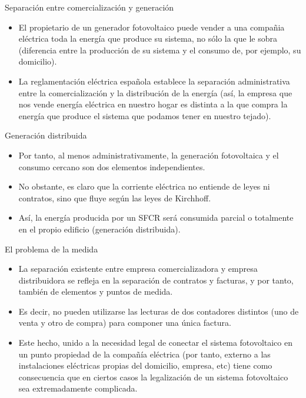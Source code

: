 \documentclass[xcolor={usenames,svgnames,dvipsnames}]{beamer}
\begin{document}
\begin{frame}[label=sec-1-4-2]{Separación entre comercialización y generación}
\begin{itemize}
\item El propietario de un generador fotovoltaico puede vender a una compañia eléctrica toda la energía que produce su sistema, no sólo la que le sobra (diferencia entre la producción de su sistema y el consumo de, por ejemplo, su domicilio).

\item La reglamentación eléctrica española establece la separación administrativa entre la comercialización y la distribución de la energía (así, la empresa que nos vende energía eléctrica en nuestro hogar es distinta a la que compra la energía que produce el sistema que podamos tener en nuestro tejado).
\end{itemize}
\end{frame}

\begin{frame}[label=sec-1-4-3]{Generación distribuida}
\begin{itemize}
\item Por tanto, al menos administrativamente, la generación fotovoltaica y el consumo cercano son dos elementos independientes.

\item No obstante, es claro que la corriente eléctrica no entiende de leyes ni contratos, sino que fluye según las leyes de Kirchhoff.

\item Así, la energía producida por un SFCR será consumida parcial o totalmente en el propio edificio (generación distribuida).
\end{itemize}
\end{frame}

\begin{frame}[label=sec-1-4-4]{El problema de la medida}
\begin{itemize}
\item La separación existente entre empresa comercializadora y empresa distribuidora se refleja en la separación de contratos y facturas, y por tanto, también de elementos y puntos de medida.

\item Es decir, no pueden utilizarse las lecturas de dos contadores distintos (uno de venta y otro de compra) para componer una única factura.

\item Este hecho, unido a la necesidad legal de conectar el sistema fotovoltaico en un punto propiedad de la compañía eléctrica (por tanto, externo a las instalaciones eléctricas propias del domicilio, empresa, etc) tiene como consecuencia que en ciertos casos la legalización de un sistema fotovoltaico sea extremadamente complicada.
\end{itemize}
\end{frame}
\end{document}
